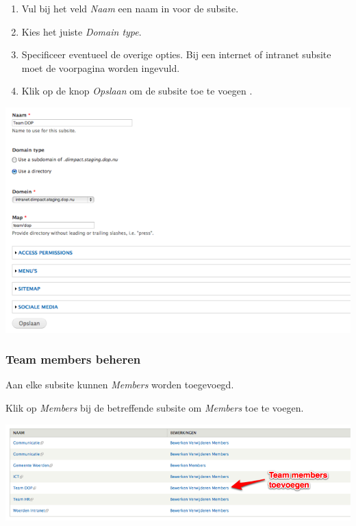 \bigskip

\begin{enumerate}
\item Vul bij het veld \emph{Naam} een naam in voor de subsite.
\item Kies het juiste \emph{Domain type}.
\item Specificeer eventueel de overige opties. Bij een internet of intranet subsite moet de voorpagina worden ingevuld.
\item Klik op de knop \emph{Opslaan} om de subsite toe te voegen .
\end{enumerate}

\bigskip

\begin{center}
	\includegraphics[width=\textwidth]{img/dominion2.png}
\end{center}

\subsubsection{Team members beheren}\label{teammembersbeheren}
Aan elke subsite kunnen \emph{Members} worden toegevoegd.

\bigskip

Klik op \emph{Members} bij de betreffende subsite om \emph{Members} toe te voegen.

\begin{center}
	\includegraphics[width=\textwidth]{img/dominion3.png}
\end{center}

